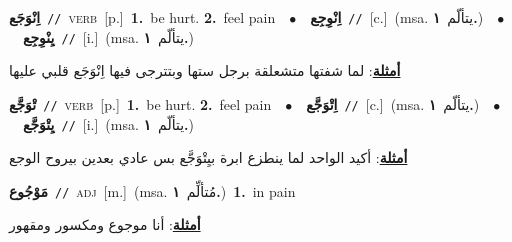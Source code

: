 \documentclass[10pt,a4paper,twoside]{article} %
\begin{document}
\begin{multicols}{2}
{\setlength\topsep{0pt}\textbf{\foreignlanguage{arabic}{اِنْوَجَع}}\ {\color{gray}\texttt{//}\color{black}}\ \textsc{verb}\ [p.]\ \textbf{1.}~be hurt.  \textbf{2.}~feel pain\ \ $\bullet$\ \ \setlength\topsep{0pt}\textbf{\foreignlanguage{arabic}{اِنْوِجِع}}\ {\color{gray}\texttt{//}\color{black}}\ [c.]\ \color{gray}(msa. \foreignlanguage{arabic}{يتألّم}~\foreignlanguage{arabic}{\textbf{١.}})\color{black}\ \ $\bullet$\ \ \setlength\topsep{0pt}\textbf{\foreignlanguage{arabic}{يِنْوِجِع}}\ {\color{gray}\texttt{//}\color{black}}\ [i.]\ \color{gray}(msa. \foreignlanguage{arabic}{يتألّم}~\foreignlanguage{arabic}{\textbf{١.}})\color{black}\  \begin{flushright}\color{gray}\foreignlanguage{arabic}{\textbf{\underline{\foreignlanguage{arabic}{أمثلة}}}: لما شفتها متشعلقة برجل ستها وبتترجى فيها اِنْوَجَع قلبي عليها}\end{flushright}\color{black}} \vspace{2mm}

{\setlength\topsep{0pt}\textbf{\foreignlanguage{arabic}{تْوَجَّع}}\ {\color{gray}\texttt{//}\color{black}}\ \textsc{verb}\ [p.]\ \textbf{1.}~be hurt.  \textbf{2.}~feel pain\ \ $\bullet$\ \ \setlength\topsep{0pt}\textbf{\foreignlanguage{arabic}{اِتْوَجَّع}}\ {\color{gray}\texttt{//}\color{black}}\ [c.]\ \color{gray}(msa. \foreignlanguage{arabic}{يتألّم}~\foreignlanguage{arabic}{\textbf{١.}})\color{black}\ \ $\bullet$\ \ \setlength\topsep{0pt}\textbf{\foreignlanguage{arabic}{يِتْوَجَّع}}\ {\color{gray}\texttt{//}\color{black}}\ [i.]\ \color{gray}(msa. \foreignlanguage{arabic}{يتألّم}~\foreignlanguage{arabic}{\textbf{١.}})\color{black}\  \begin{flushright}\color{gray}\foreignlanguage{arabic}{\textbf{\underline{\foreignlanguage{arabic}{أمثلة}}}: أكيد الواحد لما ينطزع ابرة بيِتْوَجَّع بس عادي بعدين بيروح الوجع}\end{flushright}\color{black}} \vspace{2mm}

{\setlength\topsep{0pt}\textbf{\foreignlanguage{arabic}{مَوْجُوع}}\ {\color{gray}\texttt{//}\color{black}}\ \textsc{adj}\ [m.]\ \color{gray}(msa. \foreignlanguage{arabic}{مُتألِّم}~\foreignlanguage{arabic}{\textbf{١.}})\color{black}\ \textbf{1.}~in pain\  \begin{flushright}\color{gray}\foreignlanguage{arabic}{\textbf{\underline{\foreignlanguage{arabic}{أمثلة}}}: أنا موجوع ومكسور ومقهور}\end{flushright}\color{black}} \vspace{2mm}


\end{multicols}
\end{document}
